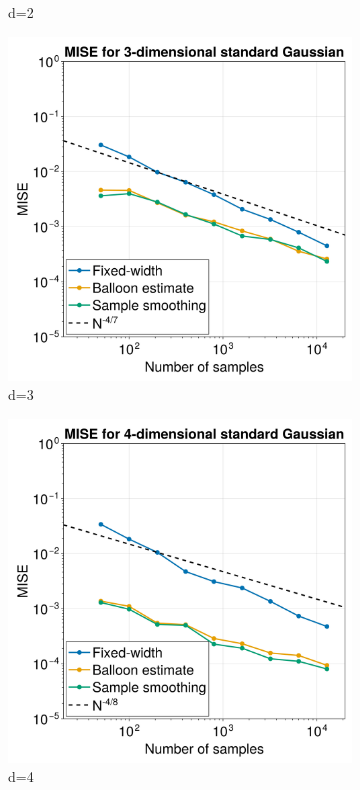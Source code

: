 \documentclass{article}
\begin{document}
\begin{figure}
\begin{subfigure}{.5\textwidth}
  \caption{d=2}
  \label{fig:MISE-2}
\end{subfigure}
\begin{subfigure}{.5\textwidth}
  \centering
  \includegraphics[width=0.7\linewidth]{images/MISE_d=3.png}
  \caption{d=3}
  \label{fig:MISE-3}
\end{subfigure}
\begin{subfigure}{.5\textwidth}
  \centering
  \includegraphics[width=0.7\linewidth]{images/MISE_d=4.png}
  \caption{d=4}
  \label{fig:MISE-4}
\end{subfigure}
\begin{subfigure}{.5\textwidth}
  \centering

\end{subfigure}
\end{figure}
\end{document}
